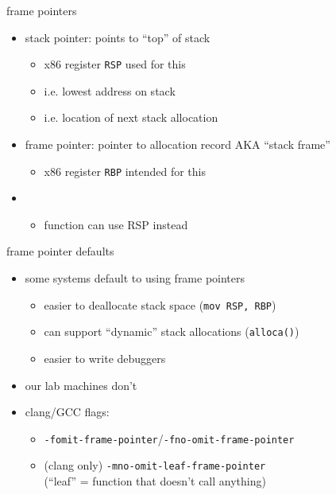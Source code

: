 \begin{frame}{frame pointers}
    \begin{itemize}
    \item stack pointer: points to ``top'' of stack
        \begin{itemize}
        \item x86 register \texttt{RSP} used for this
        \item i.e. lowest address on stack
        \item i.e. location of next stack allocation
        \end{itemize}
    \item frame pointer: pointer to allocation record AKA ``stack frame''
        \begin{itemize}
        \item x86 register \texttt{RBP} intended for this
        \end{itemize}
    \item {}
        \begin{itemize}
        \item function can use RSP instead
        \end{itemize}
    \end{itemize}
\end{frame}

\begin{frame}{frame pointer defaults}
    \begin{itemize}
    \item some systems default to using frame pointers
        \begin{itemize}
        \item easier to deallocate stack space ({\tt mov RSP, RBP})
        \item can support ``dynamic'' stack allocations (\texttt{alloca()})
        \item easier to write debuggers
        \end{itemize}
    \item our lab machines don't
    \item clang/GCC flags:
        \begin{itemize}
            \item {\tt-fomit-frame-pointer}/{\tt-fno-omit-frame-pointer}
            \item (clang only) {\tt-mno-omit-leaf-frame-pointer} \\
                (``leaf'' = function that doesn't call anything)
        \end{itemize}
    \end{itemize}
\end{frame}

